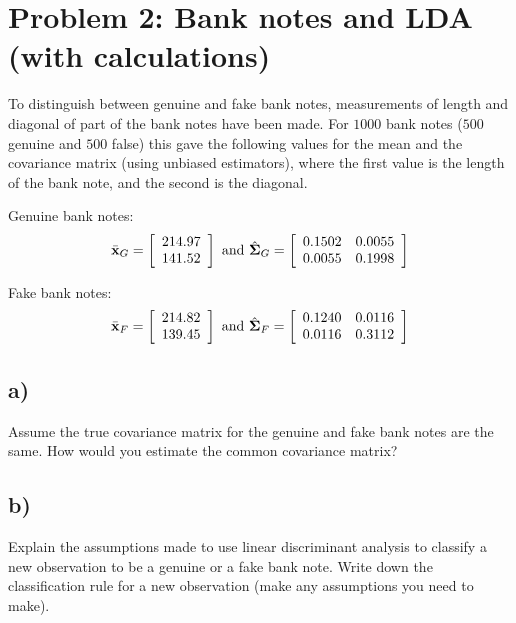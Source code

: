 \documentclass[
]{article}
\begin{document}
\section{Problem 2: Bank notes and LDA (with
calculations)}\label{problem-2-bank-notes-and-lda-with-calculations}

To distinguish between genuine and fake bank notes, measurements of
length and diagonal of part of the bank notes have been made. For
\(1000\) bank notes (\(500\) genuine and \(500\) false) this gave the
following values for the mean and the covariance matrix (using unbiased
estimators), where the first value is the length of the bank note, and
the second is the diagonal.

Genuine bank notes: \[
\bar{\bf x}_G=\left[     \begin{array}{c} 214.97 \\ 141.52  \end{array} \right]
\text{ and }
\hat{\boldsymbol \Sigma}_G=\left[     \begin{array}{cc} 0.1502 & 0.0055 \\ 0.0055 & 0.1998 
\end{array} \right]
\]

Fake bank notes: \[
\bar{\bf x}_F= \left[     \begin{array}{c} 214.82 \\ 139.45  \end{array} \right]
\text{ and }
\hat{\boldsymbol \Sigma}_F= \left[     \begin{array}{cc} 0.1240 & 0.0116 \\ 0.0116 & 0.3112 
\end{array} \right]
\]

\subsection{a)}\label{a-1}

Assume the true covariance matrix for the genuine and fake bank notes
are the same. How would you estimate the common covariance matrix?

\subsection{b)}\label{b-1}

Explain the assumptions made to use linear discriminant analysis to
classify a new observation to be a genuine or a fake bank note. Write
down the classification rule for a new observation (make any assumptions
you need to make).
\end{document}
